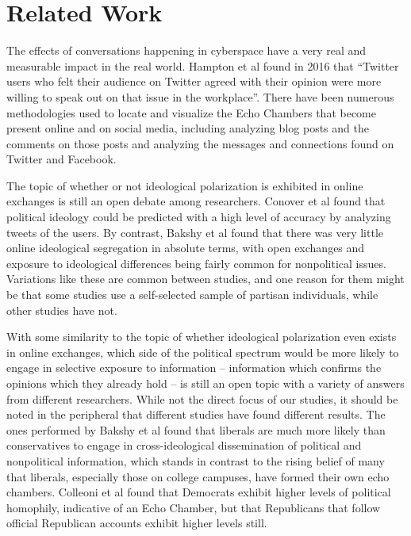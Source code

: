 \documentclass[journal]{IEEEtran}
\begin{document}
	\section{Related Work}
	
	The effects of conversations happening in cyberspace have a very real and measurable impact in the real world. Hampton et al \cite{hampton} found in 2016 that “Twitter users who felt their audience on Twitter agreed with their opinion were more willing to speak out on that issue in the workplace”. There have been numerous methodologies used to locate and visualize the Echo Chambers that become present online and on social media, including analyzing blog posts and the comments on those posts and analyzing the messages and connections found on Twitter and Facebook. 

	The topic of whether or not ideological polarization is exhibited in online exchanges is still an open debate among researchers. Conover et al \cite{conover} found that political ideology could be predicted with a high level of accuracy by analyzing tweets of the users. By contrast, Bakshy et al \cite{Bakshy1130} found that there was very little online ideological segregation in absolute terms, with open exchanges and exposure to ideological differences being fairly common for nonpolitical issues. Variations like these are common between studies, and one reason for them might be that some studies use a self-selected sample of partisan individuals, while other studies have not. 
	
	With some similarity to the topic of whether ideological polarization even exists in online exchanges, which side of the political spectrum would be more likely to engage in selective exposure to information -- information which confirms the opinions which they already hold -- is still an open topic with a variety of answers from different researchers. While not the direct focus of our studies, it should be noted in the peripheral that different studies have found different results. The ones performed by Bakshy et al \cite{Bakshy1130} found that liberals are much more likely than conservatives to engage in cross-ideological dissemination of political and nonpolitical information, which stands in contrast to the rising belief of many that liberals, especially those on college campuses, have formed their own echo chambers. Colleoni et al \cite{colleoni} found that Democrats exhibit higher levels of political homophily, indicative of an Echo Chamber, but that Republicans that follow official Republican accounts exhibit higher levels still.
	
\end{document}
